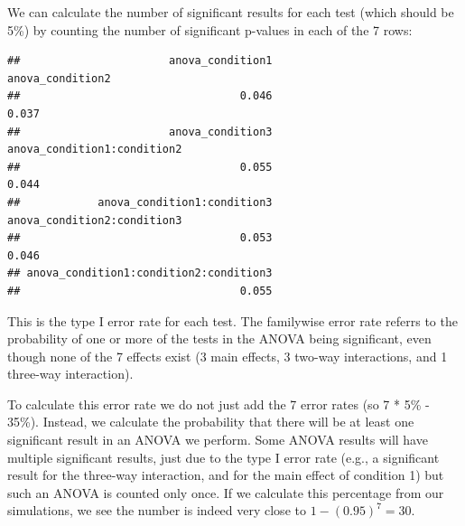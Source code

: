 \documentclass[
]{book}
\newenvironment{Shaded}{\begin{snugshade}}{\end{snugshade}}
\newcommand{\ControlFlowTok}[1]{\textcolor[rgb]{0.13,0.29,0.53}{\textbf{#1}}}
\newcommand{\DecValTok}[1]{\textcolor[rgb]{0.00,0.00,0.81}{#1}}
\newcommand{\FloatTok}[1]{\textcolor[rgb]{0.00,0.00,0.81}{#1}}
\newcommand{\FunctionTok}[1]{\textcolor[rgb]{0.00,0.00,0.00}{#1}}
\newcommand{\NormalTok}[1]{#1}
\newcommand{\SpecialCharTok}[1]{\textcolor[rgb]{0.00,0.00,0.00}{#1}}
\begin{document}
We can calculate the number of significant results for each test (which should be 5\%) by counting the number of significant p-values in each of the 7 rows:

\begin{Shaded}
\end{Shaded}

\begin{verbatim}
##                       anova_condition1                       anova_condition2 
##                                  0.046                                  0.037 
##                       anova_condition3            anova_condition1:condition2 
##                                  0.055                                  0.044 
##            anova_condition1:condition3            anova_condition2:condition3 
##                                  0.053                                  0.046 
## anova_condition1:condition2:condition3 
##                                  0.055
\end{verbatim}

This is the type I error rate for each test. The familywise error rate referrs to the probability of one or more of the tests in the ANOVA being significant, even though none of the 7 effects exist (3 main effects, 3 two-way interactions, and 1 three-way interaction).

To calculate this error rate we do not just add the 7 error rates (so 7 * 5\% - 35\%). Instead, we calculate the probability that there will be at least one significant result in an ANOVA we perform. Some ANOVA results will have multiple significant results, just due to the type I error rate (e.g., a significant result for the three-way interaction, and for the main effect of condition 1) but such an ANOVA is counted only once. If we calculate this percentage from our simulations, we see the number is indeed very close to \(1-(0.95)^7 = 30%
\).
\end{document}
